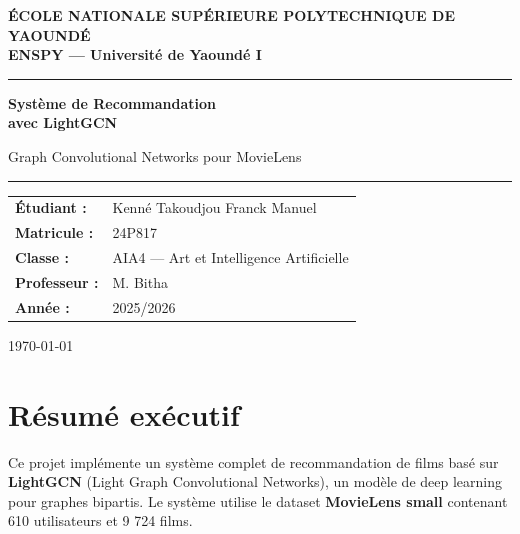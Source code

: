 \documentclass[12pt,a4paper]{report}
\begin{document}
\begin{titlepage}
\centering
\vspace*{2cm}

{\Large\bfseries\color{Navy}
  ÉCOLE NATIONALE SUPÉRIEURE POLYTECHNIQUE DE YAOUNDÉ\\
  ENSPY — Université de Yaoundé I
}

\vspace{2cm}
{\color{gray}\hrule}

\vspace{2cm}
{\Huge\bfseries\color{Navy}
  Système de Recommandation\\
  avec LightGCN
}

\vspace{0.5cm}
{\Large\color{Steel}
  Graph Convolutional Networks pour MovieLens
}

\vspace{2cm}
{\color{gray}\hrule}

\vspace{3cm}

\begin{tabular}{ll}
  \textbf{Étudiant :}     & Kenné Takoudjou Franck Manuel \\
  \textbf{Matricule :}    & 24P817 \\
  \textbf{Classe :}       & AIA4 — Art et Intelligence Artificielle \\
  \textbf{Professeur :}   & M. Bitha \\
  \textbf{Année :}        & 2025/2026 \\
\end{tabular}

\vfill
{\small\color{gray}\today}

\end{titlepage}

\newpage
\section*{Résumé exécutif}

Ce projet implémente un système complet de recommandation de films basé sur
\textbf{LightGCN} (Light Graph Convolutional Networks), un modèle de deep
learning pour graphes bipartis. Le système utilise le dataset \textbf{MovieLens
small} contenant 610 utilisateurs et 9 724 films.
\end{document}
